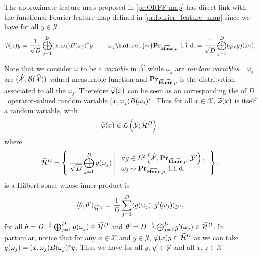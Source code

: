\begin{remark}
The approximate feature map proposed in \cref{pr:ORFF-map} has direct link with the functional Fourier feature map defined in \cref{pr:fourier_feature_map} since we have for all $y\in\mathcal{Y}$
\begin{dmath}
\tildePhi{1:D}(x)y = \frac{1}{\sqrt{D}}\Vect_{j=1}^D\pairing{x, \omega_j}B(\omega_j)^\adjoint y, \qquad \omega_j \hiderel{\sim} \probability_{\dual{\Haar},\rho} \enskip\text{\iid}
= \frac{1}{\sqrt{D}} \Vect_{j=1}^D (\Phi_x y)(\omega_j).
\end{dmath}
\end{remark}
Note that we consider $\omega$ to be a \emph{variable} in $\widehat{\mathcal{X}}$ while $\omega_j$ are \emph{random variables}. \Ie~$\omega_j$ are $(\widehat{\mathcal{X}}, \mathcal{B}(\widehat{\mathcal{X}}))$-valued measurable function and ${\mathbf{{Pr}}}_{\widehat{\mathbf{Haar}},\rho}$ is the distribution associated to all the $\omega_j$. Therefore $\tildePhi{1:D}(x)$ can be seen as an  corresponding the  of $D$ \iid~operator-valued random variable $(x, \omega_j)B(\omega_j)^*$. Thus for all $x\in\mathcal{X}$, $\tildePhi{1:D}(x)$ is itself a random variable, with
\begin{dmath*}
\tildePhi{1:D}(x)\in\mathcal{L}\left(\mathcal{Y};\widetilde{\mathcal{H}}^D\right),
\end{dmath*}
where
\begin{dmath*}
\widetilde{\mathcal{H}}^D = \Set{\frac{1}{\sqrt{D}}\Vect_{j=1}^Dg(\omega_j)| \begin{array}{l} \forall g\in L^2\left(\dual{\mathcal{X}}, \probability_{\dual{\Haar},\rho}, \mathcal{Y}'\right), \\ \omega_j\sim \probability_{\dual{\Haar},\rho} \enskip \text{\iid} \end{array}},
\end{dmath*}
is a Hilbert space whose inner product is
\begin{dmath*}
\inner{\theta, \theta'}_{\widetilde{\mathcal{H}}^D} = \frac{1}{D}\sum_{j=1}^D\inner{g(\omega_j),g'(\omega_j)}_{\mathcal{Y}'},
\end{dmath*}
for all $\theta=D^{-\frac{1}{2}}\operatorname{\bigoplus}_{j=1}^Dg(\omega_j)\in\widetilde{\mathcal{H}}^D$ and $\theta'=D^{-\frac{1}{2}}\operatorname{\bigoplus}_{j=1}^Dg'(\omega_j)\in\widetilde{\mathcal{H}}^D$. In particular, notice that for any $x\in\mathcal{X}$ and $y\in\mathcal{Y}$, $\tildePhi{1:D}(x)y\in\widetilde{\mathcal{H}}^D$ as we can take $g(\omega_j)=(x,\omega_j)B(\omega_j)^* y$. Thus we have for all $y$, $y'\in\mathcal{Y}$ and all $x$, $z\in\mathcal{X}$
